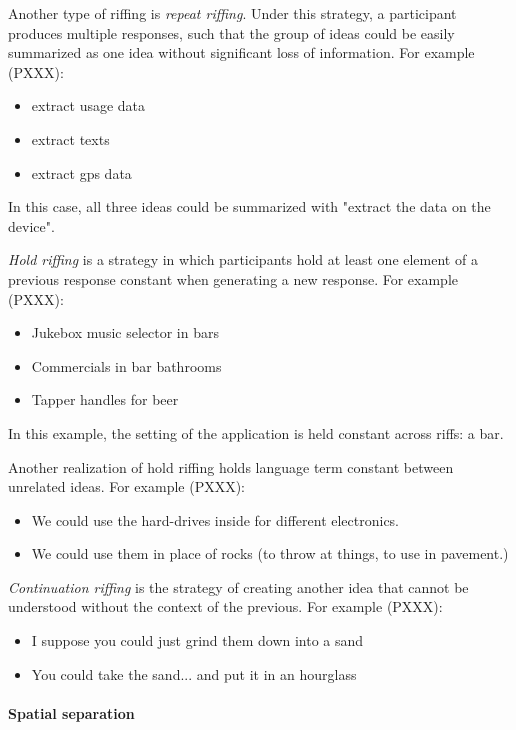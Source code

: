 Another type of riffing is \emph{repeat riffing}. Under this strategy, a participant produces multiple responses, such that the group of ideas could be easily summarized as one idea without significant loss of information. For example (PXXX):

\begin{itemize}
    \item extract usage data
    \item extract texts
    \item extract gps data
\end{itemize}

In this case, all three ideas could be summarized with "extract the data on the device".

\emph{Hold riffing} is a strategy in which participants hold at least one element of a previous response constant when generating a new response. For example (PXXX):

\begin{itemize}
    \item Jukebox music selector in bars
    \item Commercials in bar bathrooms 
    \item Tapper handles for beer 
\end{itemize}

In this example, the setting of the application is held constant across riffs: a bar.

Another realization of hold riffing holds language term constant between unrelated ideas. For example (PXXX):

\begin{itemize}
    \item We could use the hard-drives inside for different electronics.
    \item We could use them in place of rocks (to throw at things, to use in pavement.)
\end{itemize}

\emph{Continuation riffing} is the strategy of creating another idea that cannot be understood without the context of the previous. For example (PXXX):

\begin{itemize}
    \item I suppose you could just grind them down into a sand
    \item You could take the sand... and put it in an hourglass
\end{itemize}

\paragraph{Spatial separation}

